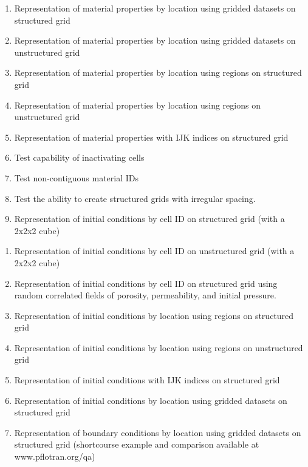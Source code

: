 \begin{enumerate}[label=Test \alph*.,ref=Test \alph*,nosep]
	\item \label{testRepMatGridStruc} Representation of material properties by location using gridded datasets on structured grid
	\item \label{testRepMatGridUnstruc} Representation of material properties by location using gridded datasets on unstructured grid
	\item \label{testRepMatRegStruc} Representation of material properties by location using regions on structured grid
	\item \label{testRepMatRegUnstruc} Representation of material properties by location using regions on unstructured grid
	\item \label{testRepMatIJKStruc} Representation of material properties with IJK indices on structured grid
	\item \label{testInactive} Test capability of inactivating cells
	\item \label{testNonContMaterialIDS} Test non-contiguous material IDs
	\item \label{testStructIrregGrid} Test the ability to create structured grids with irregular spacing.
	\item \label{testRepICCellIDStruc} Representation of initial conditions by cell ID on structured grid (with a 2x2x2 cube)
\end{enumerate}

\begin{enumerate}[label=Test \greek*.,ref=Test \greek*,nosep]
\item \label{testRepICCellIDUnstruc} Representation of initial conditions by cell ID on unstructured grid (with a 2x2x2 cube)
\item \label{testRepICCellIDStruc16} Representation of initial conditions by cell ID on structured grid using random correlated fields of porosity, permeability, and initial pressure.
\item \label{testRepICRegStruc} Representation of initial conditions by location using regions on structured grid
\item \label{testRepICRegUnstruc} Representation of initial conditions by location using regions on unstructured grid
\item \label{testRepICIJKStruc} Representation of initial conditions with IJK indices on structured grid
\item \label{testRepICGridStruc} Representation of initial conditions by location using gridded datasets on structured grid
\item \label{testRepBCGridStruc} Representation of boundary conditions by location using gridded datasets on structured grid (shortcourse example  and comparison available at www.pflotran.org/qa)
\end{enumerate}

